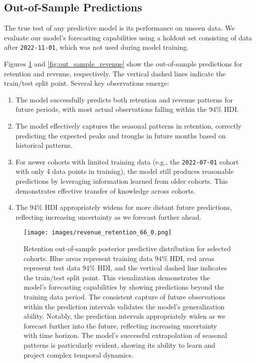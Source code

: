 \documentclass[11pt]{amsart}
\theoremstyle{definition}
\begin{document}
\subsection{Out-of-Sample Predictions}

The true test of any predictive model is its performance on unseen data. We evaluate our model's forecasting capabilities
using a holdout set consisting of data after \texttt{2022-11-01}, which was not used during model training.

Figures \ref{fig:out_sample_retention} and \ref{fig:out_sample_revenue} show the out-of-sample predictions for retention and
revenue, respectively. The vertical dashed lines indicate the train/test split point. Several key observations emerge:

\begin{enumerate}
    \item The model successfully predicts both retention and revenue patterns for future periods, with most actual
          observations falling within the $94\%$ HDI.

    \item The model effectively captures the seasonal patterns in retention, correctly predicting the expected peaks and
          troughs in future months based on historical patterns.

    \item For newer cohorts with limited training data (e.g., the \texttt{2022-07-01} cohort with only 4 data points in
          training), the model still produces reasonable predictions by leveraging information learned from older cohorts.
          This demonstrates effective transfer of knowledge across cohorts.

    \item The $94\%$ HDI appropriately widens for more distant future predictions, reflecting increasing uncertainty as we
          forecast further ahead.
\end{enumerate}

\begin{figure}
    \centering
    \texttt{[image: images/revenue\_retention\_66\_0.png]}
    \caption{Retention out-of-sample posterior predictive distribution for selected cohorts. Blue areas represent training
        data $94\%$ HDI, red areas represent test data $94\%$ HDI, and the vertical dashed line indicates the train/test
        split point. This visualization demonstrates the model's forecasting capabilities by showing predictions beyond
        the training data period. The consistent capture of future observations within the prediction intervals validates
        the model's generalization ability. Notably, the prediction intervals appropriately widen as we forecast further
        into the future, reflecting increasing uncertainty with time horizon. The model's successful extrapolation of
        seasonal patterns is particularly evident, showing its ability to learn and project complex temporal dynamics.}
    \label{fig:out_sample_retention}
\end{figure}
\end{document}
